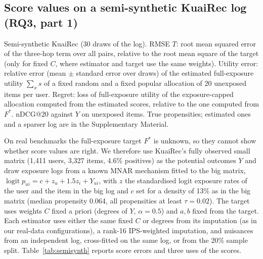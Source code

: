 \subsection{Score values on a semi-synthetic KuaiRec log (RQ3, part 1)}\label{sec:semisynth}

\begin{table}[t]\centering\small
\caption{Semi-synthetic KuaiRec (30 draws of the log). RMSE $T$: root mean
squared error of the three-hop term over all pairs, relative to the root
mean square of the target (only for fixed $C$, where estimator and target use
the same weights). Utility error: relative error (mean $\pm$ standard error over
draws) of the estimated full-exposure utility $\sum_x s$ of a fixed random and a
fixed popular allocation of 20 unexposed items per user. Regret: loss of
full-exposure utility of the exposure-capped allocation computed from the
estimated scores, relative to the one computed from $F^*$. nDCG@20 against $Y$
on unexposed items. True propensities; estimated ones and a sparser log are
in the Supplementary Material.}\label{tab:semisynth}
\begin{adjustbox}{max width=\textwidth}

\end{adjustbox}
\end{table}

On real benchmarks the full-exposure target $F^*$ is unknown, so they cannot show
whether score values are right. We therefore use KuaiRec's fully observed small matrix
(1{,}411 users, 3{,}327 items, 4.6\% positives) as the potential outcomes $Y$ and
draw exposure logs from a known MNAR mechanism fitted to the big matrix,
$\operatorname{logit}p_{ui}=c+z_u+1.5z_i+Y_{ui}$, with $z$ the standardised logit
exposure rates of the user and the item in the big log and $c$ set for a
density of 13\% as in the big matrix (median propensity 0.064, all
propensities at least $\tau=0.02$). The target uses weights $C$ fixed a priori
(degrees of $Y$, $\alpha=0.5$) and $a,b$ fixed from the target. Each estimator
uses either the same fixed $C$ or degrees from its imputation (as in our
real-data configurations), a rank-16 IPS-weighted imputation, and nuisances
from an independent log, cross-fitted on the same log, or from the 20\% sample
split. Table~\ref{tab:semisynth} reports score errors and three uses of the
scores.

